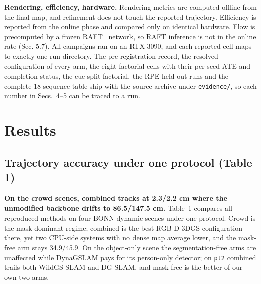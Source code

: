 \textbf{Rendering, efficiency, hardware.} Rendering metrics are computed offline from the final map, and refinement does not touch the reported trajectory. Efficiency is reported from the online phase and compared only on identical hardware. Flow is precomputed by a frozen RAFT~\cite{raft} network, so RAFT inference is not in the online rate (Sec. 5.7). All campaigns ran on an RTX 3090, and each reported cell maps to exactly one run directory. The pre-registration record, the resolved configuration of every arm, the eight factorial cells with their per-seed ATE and completion status, the cue-split factorial, the RPE held-out runs and the complete 18-sequence table ship with the source archive under \texttt{evidence/}, so each number in Secs.~4--5 can be traced to a run.




\section{Results}


\subsection{Trajectory accuracy under one protocol (Table 1)}


\textbf{On the crowd scenes, combined tracks at 2.3/2.2 cm where the unmodified backbone drifts to 86.5/147.5 cm.} Table~1 compares all reproduced methods on four BONN dynamic scenes under one protocol. Crowd is the mask-dominant regime; combined is the best RGB-D 3DGS configuration there, yet two CPU-side systems with no dense map average lower, and the mask-free arm stays 34.9/45.9. On the object-only scene the segmentation-free arms are unaffected while DynaGSLAM pays for its person-only detector; on \texttt{pt2} combined trails both WildGS-SLAM and DG-SLAM, and mask-free is the better of our own two arms.


